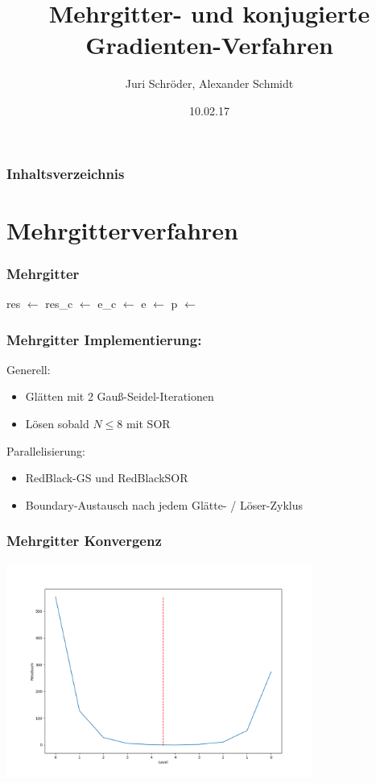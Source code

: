 \documentclass[]{beamer}
\title{Mehrgitter- und konjugierte Gradienten-Verfahren}
\author{Juri Schröder, Alexander Schmidt}
\date{10.02.17}
\begin{document}
\begin{frame}
\titlepage
\end{frame}

\begin{frame}
\frametitle{Inhaltsverzeichnis}
\tableofcontents
\end{frame}


\section{Mehrgitterverfahren}
\begin{frame}
  \frametitle{Mehrgitter}
  \begin{algorithmic}
    \State {}
    \State {}
    \Else
    \State res $\gets$ 
    \State res\_c $\gets$ 
    \State e\_c $\gets$ 
    \State e $\gets$ 
    \State p $\gets$ 
    \State {}
    \EndIf
    \EndFunction
  \end{algorithmic}
\end{frame}

\begin{frame}
  \frametitle{Mehrgitter Implementierung:}
  Generell:
  \begin{itemize}
    \item Glätten mit 2 Gauß-Seidel-Iterationen
    \item Lösen sobald $N \leq 8$ mit SOR
  \end{itemize}
  Parallelisierung:
  \begin{itemize}
    \item RedBlack-GS und RedBlackSOR
    \item Boundary-Austausch nach jedem Glätte- / Löser-Zyklus
  \end{itemize}
\end{frame}

\begin{frame}
  \frametitle{Mehrgitter Konvergenz}
  \begin{center}
    \includegraphics[width=0.9\linewidth, height=7cm]{MG_res_by_level.png}
  \end{center}
\end{frame}
\end{document}
